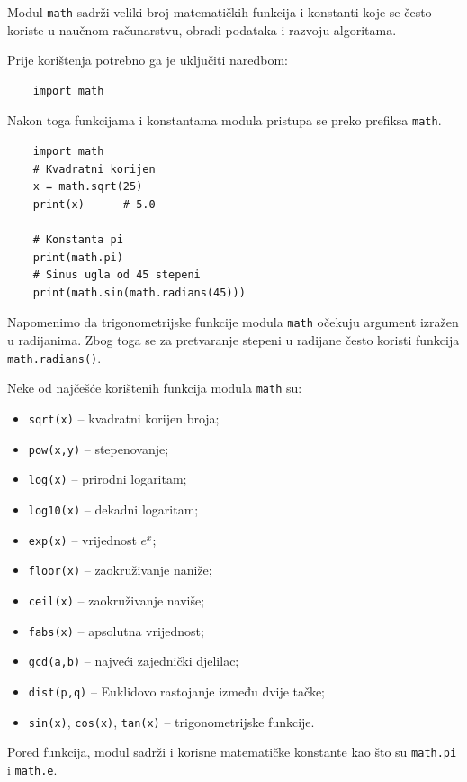 Modul \texttt{math} sadrži veliki broj matematičkih funkcija i konstanti koje se često koriste u naučnom računarstvu, obradi podataka i razvoju algoritama.

Prije korištenja potrebno ga je uključiti naredbom:

\begin{verbatim}
	import math
\end{verbatim}

Nakon toga funkcijama i konstantama modula pristupa se preko prefiksa \texttt{math}.

\begin{verbatim}
	import math
	# Kvadratni korijen
	x = math.sqrt(25)
	print(x)      # 5.0
	
	# Konstanta pi
	print(math.pi)
	# Sinus ugla od 45 stepeni
	print(math.sin(math.radians(45)))
\end{verbatim}

Napomenimo da trigonometrijske funkcije modula \texttt{math} očekuju argument izražen u radijanima. Zbog toga se za pretvaranje stepeni u radijane često koristi funkcija \texttt{math.radians()}.

Neke od najčešće korištenih funkcija modula \texttt{math} su:

\begin{itemize}
	\item \texttt{sqrt(x)} -- kvadratni korijen broja;
	\item \texttt{pow(x,y)} -- stepenovanje;
	\item \texttt{log(x)} -- prirodni logaritam;
	\item \texttt{log10(x)} -- dekadni logaritam;
	\item \texttt{exp(x)} -- vrijednost $e^x$;
	\item \texttt{floor(x)} -- zaokruživanje naniže;
	\item \texttt{ceil(x)} -- zaokruživanje naviše;
	\item \texttt{fabs(x)} -- apsolutna vrijednost;
	\item \texttt{gcd(a,b)} -- najveći zajednički djelilac;
	\item \texttt{dist(p,q)} -- Euklidovo rastojanje između dvije tačke;
	\item \texttt{sin(x)}, \texttt{cos(x)}, \texttt{tan(x)} -- trigonometrijske funkcije.
\end{itemize}

Pored funkcija, modul sadrži i korisne matematičke konstante kao što su \texttt{math.pi} i \texttt{math.e}.

